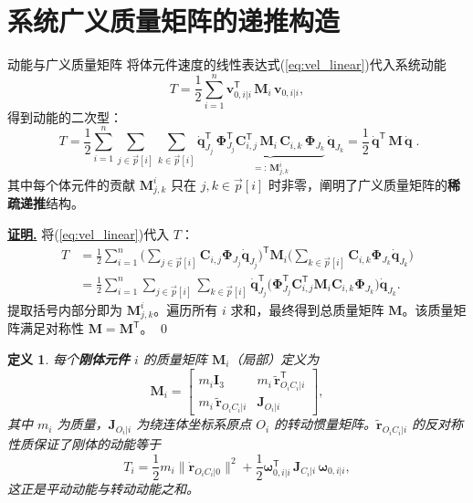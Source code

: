 \documentclass[10pt,a4paper]{book}
\theoremstyle{thmstyle}
\theoremstyle{defstyle}
\newtheorem{definition}[theorem]{定义}
\theoremstyle{prostyle}
\renewenvironment{proof}[1][证明]{\par{\kaishu \underline{\textbf{#1.}}} \;\fangsong}{\qed\par}
\newcommand{\T}{^{\mathsf{T}}}
\renewcommand{\vec}[1]{\bm{#1}}
\newcommand{\mat}[1]{\bm{#1}}
\newcommand{\tildev}[1]{\tilde{#1}}
\begin{document}
\section{系统广义质量矩阵的递推构造}

\begin{myTheorem}{动能与广义质量矩阵}
将体元件速度的线性表达式(\ref{eq:vel_linear})代入系统动能
\[
T = \frac{1}{2}\sum_{i=1}^{n}\vec{v}_{0,i|i}\T\,\mat{M}_i\,\vec{v}_{0,i|i},
\]
得到动能的二次型：
\begin{equation}
\boxed{\;T = \frac{1}{2}\sum_{i=1}^{n}
\sum_{j\in\overrightarrow{p}[i]}\sum_{k\in\overrightarrow{p}[i]}
\dot{\vec{q}}_{J_j}\T\,\underbrace{
\mat{\Phi}_{J_j}\T\mat{C}_{i,j}\T\,\mat{M}_i\,\mat{C}_{i,k}\,\mat{\Phi}_{J_k}
}_{\displaystyle =:\, \mat{M}_{j,k}^{i}}
\,\dot{\vec{q}}_{J_k}
= \frac{1}{2}\,\dot{\vec{q}}\T\,\mat{M}\,\dot{\vec{q}}\;}.
\label{eq:kinetic_quadratic}
\end{equation}
其中每个体元件的贡献 $\mat{M}_{j,k}^{i}$ 只在 $j,k\in\overrightarrow{p}[i]$ 时非零，阐明了广义质量矩阵的\textbf{稀疏递推}结构。
\end{myTheorem}

\begin{proof}
将(\ref{eq:vel_linear})代入 $T$：
\begin{align*}
T &= \frac{1}{2}\sum_{i=1}^{n}
\biggl(\sum_{j\in\overrightarrow{p}[i]} \mat{C}_{i,j}\mat{\Phi}_{J_j}\dot{\vec{q}}_{J_j}\biggr)\T
\mat{M}_i
\biggl(\sum_{k\in\overrightarrow{p}[i]} \mat{C}_{i,k}\mat{\Phi}_{J_k}\dot{\vec{q}}_{J_k}\biggr) \\
&= \frac{1}{2}\sum_{i=1}^{n}
\sum_{j\in\overrightarrow{p}[i]}\sum_{k\in\overrightarrow{p}[i]}
\dot{\vec{q}}_{J_j}\T\bigl(\mat{\Phi}_{J_j}\T\mat{C}_{i,j}\T\mat{M}_i\mat{C}_{i,k}\mat{\Phi}_{J_k}\bigr)\dot{\vec{q}}_{J_k}.
\end{align*}
提取括号内部分即为 $\mat{M}_{j,k}^{i}$。遍历所有 $i$ 求和，最终得到总质量矩阵 $\mat{M}$。该质量矩阵满足对称性 $\mat{M} = \mat{M}\T$。
\end{proof}

\begin{definition}
每个\textbf{刚体元件} $i$ 的质量矩阵 $\mat{M}_i$（局部）定义为
\begin{equation}
\mat{M}_i =
\begin{bmatrix}
m_i\mat{I}_3 & m_i\,\tildev{\vec{r}}_{O_iC_i|i}\T \\[4pt]
m_i\,\tildev{\vec{r}}_{O_iC_i|i} & \mat{J}_{O_i|i}
\end{bmatrix},
\label{eq:Mi}
\end{equation}
其中 $m_i$ 为质量，$\mat{J}_{O_i|i}$ 为绕连体坐标系原点 $O_i$ 的转动惯量矩阵。$\tildev{\vec{r}}_{O_iC_i|i}$ 的反对称性质保证了刚体的动能等于
\[
T_i = \frac{1}{2}m_i\|\dot{\vec{r}}_{O_iC_i|0}\|^2 + \frac{1}{2}\vec{\omega}_{0,i|i}\T\,\mat{J}_{C_i|i}\,\vec{\omega}_{0,i|i},
\]
这正是平动动能与转动动能之和。
\end{definition}
\end{document}
